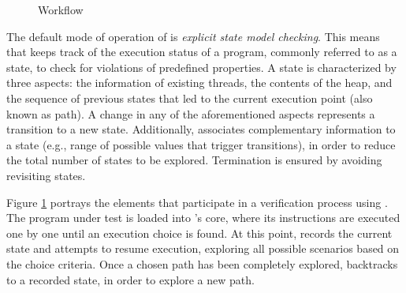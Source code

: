 \begin{figure}[t]
\caption[\jpf workflow]{\jpf Workflow}
\label{fig:jpf:process}
\end{figure}

The default mode of operation of \jpf is \textit{explicit state model checking}. This means that \jpf keeps track of the execution status of a program, commonly referred to as a state, to check for violations of predefined properties. A state is characterized by three aspects: the information of existing threads, the contents of the heap, and the sequence of previous states that led to the current execution point (also known as path). A change in any of the aforementioned aspects represents a transition to a new state. Additionally, \jpf associates complementary information to a state (e.g., range of possible values that trigger transitions), in order to reduce the total number of states to be explored. Termination is ensured by avoiding revisiting states.

Figure \ref{fig:jpf:process} portrays the elements that participate in a verification process using \jpf. The program under test is loaded into \jpf's core, where its instructions are executed one by one until an execution choice is found. At this point, \jpf records the current state and attempts to resume execution, exploring all possible scenarios based on the choice criteria. Once a chosen path has been completely explored, \jpf backtracks to a recorded state, in order to explore a new path.

